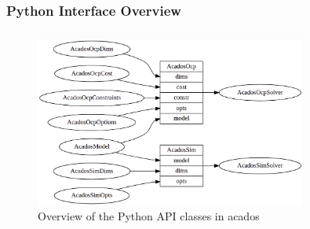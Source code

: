 \documentclass{thesisbeamer}
\newcommand\Fontvi{\fontsize{9}{10}\selectfont}
\begin{document}
\begin{frame}
	\frametitle{Python Interface Overview}
	\Fontvi
		
	\begin{figure}[h]
 		\centering
 		\includegraphics[width=0.8\textwidth]{Images/acados/python_interface.png}
 		\caption{Overview of the Python API classes in acados\protect\footnotemark}
 		\label{fig:python_interface}
 	\end{figure}
\end{frame}
\end{document}
